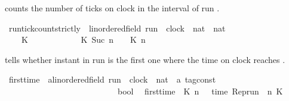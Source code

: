 \begin{isabellebody}
{\isafoldproof}%
%
\isadelimproof
%
\endisadelimproof
%
\begin{isamarkuptext}%
 counts the number of ticks on
  clock  in the interval \isatt{[0{\char`\,}\ n[} of run \isa{{\isasymrho}}.%
\end{isamarkuptext}\isamarkuptrue%
\isamarkupfalse%
\ run{\isacharunderscore}tick{\isacharunderscore}count{\isacharunderscore}strictly\ {\isacharcolon}{\isacharcolon}\ {\isacartoucheopen}{\isacharparenleft}{\isacharprime}{\isasymtau}{\isacharcolon}{\isacharcolon}linordered{\isacharunderscore}field{\isacharparenright}\ run\ {\isasymRightarrow}\ clock\ {\isasymRightarrow}\ nat\ {\isasymRightarrow}\ nat{\isacartoucheclose}\isanewline
\ \ {\isacharparenleft}{\isacartoucheopen}{\isacharhash}\isactrlsub {\isacharless}\ {\isacharunderscore}\ {\isacharunderscore}\ {\isacharunderscore}{\isacartoucheclose}{\isacharparenright}\isanewline
{}\isanewline
\ \ {\isacartoucheopen}{\isacharparenleft}{\isacharhash}\isactrlsub {\isacharless}\ {\isasymrho}\ K\ {}{\isacharparenright}\ \ \ \ \ \ \ {\isacharequal}\ {}{\isacartoucheclose}\isanewline
{\isacharbar}\ {\isacartoucheopen}{\isacharparenleft}{\isacharhash}\isactrlsub {\isacharless}\ {\isasymrho}\ K\ {\isacharparenleft}Suc\ n{\isacharparenright}{\isacharparenright}\ {\isacharequal}\ {\isacharhash}\isactrlsub {\isasymle}\ {\isasymrho}\ K\ n{\isacartoucheclose}%
\begin{isamarkuptext}%
 tells whether instant  in run \isa{{\isasymrho}}
  is the first one where the time on clock  reaches \isa{{\isasymtau}}.%
\end{isamarkuptext}\isamarkuptrue%
\isamarkupfalse%
\ first{\isacharunderscore}time\ {\isacharcolon}{\isacharcolon}\ {\isacartoucheopen}{\isacharprime}a{\isacharcolon}{\isacharcolon}linordered{\isacharunderscore}field\ run\ {\isasymRightarrow}\ clock\ {\isasymRightarrow}\ nat\ {\isasymRightarrow}\ {\isacharprime}a\ tag{\isacharunderscore}const\isanewline
\ \ \ \ \ \ \ \ \ \ \ \ \ \ \ \ \ \ \ \ \ \ \ \ \ \ {\isasymRightarrow}\ bool{\isacartoucheclose}\isanewline
{}\isanewline
\ \ {\isacartoucheopen}first{\isacharunderscore}time\ {\isasymrho}\ K\ n\ {\isasymtau}\ {\isasymequiv}\ {\isacharparenleft}time\ {\isacharparenleft}{\isacharparenleft}Rep{\isacharunderscore}run\ {\isasymrho}{\isacharparenright}\ n\ K{\isacharparenright}\ {\isacharequal}\ {\isasymtau}{\isacharparenright}\isanewline

\end{isabellebody}
